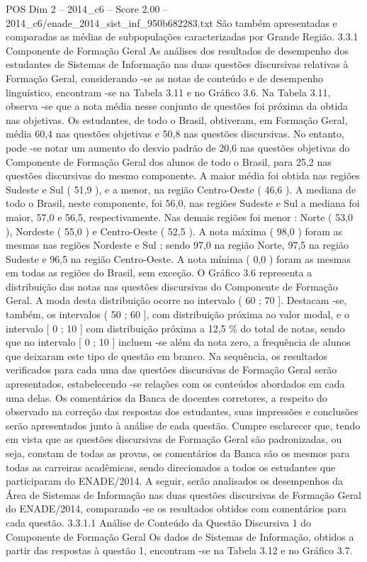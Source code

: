 \begin{textsample}{POS Dim 2 – 2014\_c6 – Score 2.00 – 2014\_c6/enade\_2014\_sist\_inf\_950b682283.txt}
São também apresentadas e comparadas as médias de subpopulações caracterizadas por Grande Região. 3.3.1 Componente de Formação Geral As análises dos resultados de desempenho dos estudantes de Sistemas de Informação nas duas questões discursivas relativas à Formação Geral, considerando -se as notas de conteúdo e de desempenho linguístico, encontram -se na Tabela 3.11 e no Gráfico 3.6.
Na Tabela 3.11, observa -se que a nota média nesse conjunto de questões foi próxima da obtida nas objetivas.
Os estudantes, de todo o Brasil, obtiveram, em Formação Geral, média 60,4 nas questões objetivas e 50,8 nas questões discursivas.
No entanto, pode -se notar um aumento do desvio padrão de 20,6 nas questões objetivas do Componente de Formação Geral dos alunos de todo o Brasil, para 25,2 nas questões discursivas do mesmo componente.
A maior média foi obtida nas regiões Sudeste e Sul ( 51,9 ), e a menor, na região Centro-Oeste ( 46,6 ).
A mediana de todo o Brasil, neste componente, foi 56,0, nas regiões Sudeste e Sul a mediana foi maior, 57,0 e 56,5, respectivamente.
Nas demais regiões foi menor : Norte ( 53,0 ), Nordeste ( 55,0 ) e Centro-Oeste ( 52,5 ).
A nota máxima ( 98,0 ) foram as mesmas nas regiões Nordeste e Sul ; sendo 97,0 na região Norte, 97,5 na região Sudeste e 96,5 na região Centro-Oeste.
A nota mínima ( 0,0 ) foram as mesmas em todas as regiões do Brasil, sem exceção.
O Gráfico 3.6 representa a distribuição das notas nas questões discursivas do Componente de Formação Geral.
A moda desta distribuição ocorre no intervalo ( 60 ; 70 ].
Destacam -se, também, os intervalos ( 50 ; 60 ], com distribuição próxima ao valor modal, e o intervalo [ 0 ; 10 ] com distribuição próxima a 12,5 \% do total de notas, sendo que no intervalo [ 0 ; 10 ] incluem -se além da nota zero, a frequência de alunos que deixaram este tipo de questão em branco.
Na sequência, os resultados verificados para cada uma das questões discursivas de Formação Geral serão apresentados, estabelecendo -se relações com os conteúdos abordados em cada uma delas.
Os comentários da Banca de docentes corretores, a respeito do observado na correção das respostas dos estudantes, suas impressões e conclusões serão apresentados junto à análise de cada questão.
Cumpre esclarecer que, tendo em vista que as questões discursivas de Formação Geral são padronizadas, ou seja, constam de todas as provas, os comentários da Banca são os mesmos para todas as carreiras acadêmicas, sendo direcionados a todos os estudantes que participaram do ENADE/2014.
A seguir, serão analisados os desempenhos da Área de Sistemas de Informação nas duas questões discursivas de Formação Geral do ENADE/2014, comparando -se os resultados obtidos com comentários para cada questão. 3.3.1.1 Análise de Conteúdo da Questão Discursiva 1 do Componente de Formação Geral Os dados de Sistemas de Informação, obtidos a partir das respostas à questão 1, encontram -se na Tabela 3.12 e no Gráfico 3.7.

\end{textsample}
